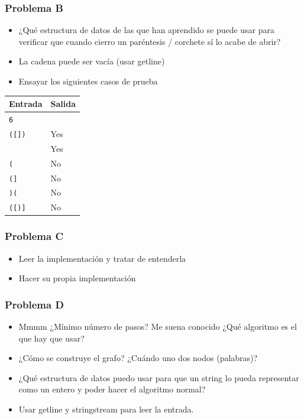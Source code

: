 \documentclass{beamer}
\begin{document}
	\begin{frame}[fragile]
		\frametitle{Problema B}
		\begin{itemize}
			\item ¿Qué estructura de datos de las que han aprendido se puede usar para verificar que cuando cierro un paréntesis / corchete sí lo acabe de abrir?
			\item La cadena puede ser vacía (usar getline)
			\item Ensayar los siguientes casos de prueba
		\end{itemize}
		\begin{center}
			\begin{tabular}{|l|l|}
				\hline
				Entrada & Salida \\
				\hline
				\verb|6|       &      \\
				\verb|([])|    & Yes  \\
				\verb||        & Yes  \\
				\verb|(|       & No   \\
				\verb|(]|      & No   \\
				\verb|)(|      & No   \\
				\verb|([)]|    & No   \\
				\hline
			\end{tabular}
		\end{center}
	\end{frame}
	
	\begin{frame}
		\frametitle{Problema C}
		\begin{itemize}
			\item Leer la implementación y tratar de entenderla
			\item Hacer su propia implementación
		\end{itemize}
	\end{frame}
	
	\begin{frame}
		\frametitle{Problema D}
		\begin{itemize}
			\item Mmmm ¿Mínimo número de pasos? Me suena conocido ¿Qué algoritmo es el que hay que usar?
			\item ¿Cómo se construye el grafo? ¿Cuándo uno dos nodos (palabras)?
			\item ¿Qué estructura de datos puedo usar para que un string lo pueda representar como un entero y poder hacer el algoritmo normal?
			\item Usar getline y stringstream para leer la entrada.
		\end{itemize}
	\end{frame}
	
\end{document}
